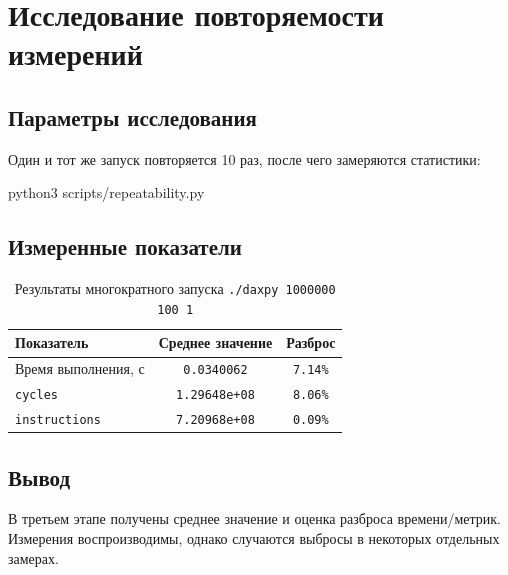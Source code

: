 \chapter{Исследование повторяемости измерений}
\label{ch:repeat}

\section{Параметры исследования}

Один и тот же запуск повторяется 10 раз, после чего замеряются статистики:

\begin{commands}
python3 scripts/repeatability.py
\end{commands}


\section{Измеренные показатели}

\begin{table}[H]
\caption{Результаты многократного запуска \texttt{./daxpy 1000000 100 1}}
\label{tab:repeat}
\begin{tabularx}{\textwidth}{|X|C|C|}
	\hline
	Показатель & Среднее значение & Разброс \\
	\hline
	Время выполнения, с & \texttt{0.0340062} & \texttt{7.14\%} \\
	\hline
	\texttt{cycles} & \texttt{1.29648e+08} & \texttt{8.06\%} \\
	\hline
	\texttt{instructions} & \texttt{7.20968e+08} & \texttt{0.09\%} \\
	\hline
\end{tabularx}
\end{table}

\section{Вывод}

В третьем этапе получены среднее значение и оценка разброса времени/метрик.
Измерения воспроизводимы, однако случаются выбросы в некоторых отдельных замерах.
